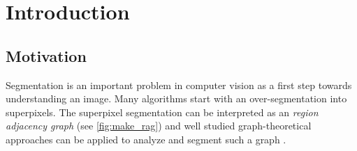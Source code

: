 \chapter{Introduction}\label{main_introduction}


\section{Motivation}
Segmentation is an important problem in computer vision as a first step
towards understanding an image. Many algorithms start with an over-segmentation
into superpixels.
The superpixel segmentation can be interpreted as an \emph{region adjacency graph} (see \cref{fig:make_rag}) and
well studied graph-theoretical approaches can be applied to analyze and segment such a graph \cite{vlachos_1993_csv}.










